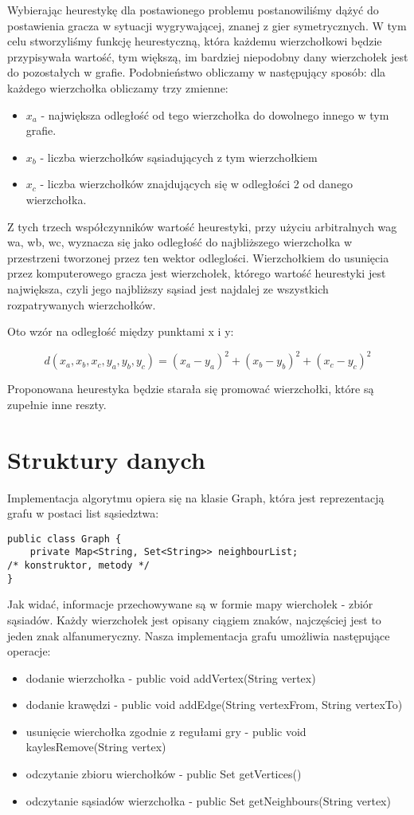 \documentclass[11pt,a4paper]{article}
\begin{document}
Wybierając heurestykę dla postawionego problemu postanowiliśmy dążyć do postawienia gracza w sytuacji wygrywającej, znanej z gier symetrycznych. W tym celu stworzyliśmy funkcję heurestyczną, która każdemu wierzchołkowi będzie przypisywała wartość, tym większą, im bardziej niepodobny dany wierzchołek jest do pozostałych w grafie. Podobnieństwo obliczamy w następujący sposób: dla każdego wierzchołka obliczamy trzy zmienne: 
\begin{itemize}
\item $x_a$ - największa odległość od tego wierzchołka do dowolnego innego w tym grafie.
\item $x_b$ - liczba wierzchołków sąsiadujących z tym wierzchołkiem
\item $x_c$ - liczba wierzchołków znajdujących się w odległości 2 od danego wierzchołka. 
\end{itemize}

Z tych trzech współczynników wartość heurestyki, przy użyciu arbitralnych wag wa, wb, wc, wyznacza się jako odległość do najbliższego wierzchołka w przestrzeni tworzonej przez ten wektor odleglości. Wierzchołkiem do usunięcia przez komputerowego gracza jest wierzchołek, którego wartość heurestyki jest największa, czyli jego najbliższy sąsiad jest najdalej ze wszystkich rozpatrywanych wierzchołków.

Oto wzór na odległość między punktami x i y:

$$d(x_a,x_b,x_c,y_a,y_b,y_c)=(x_a-y_a)^2+(x_b-y_b)^2+(x_c-y_c)^2 $$

Proponowana heurestyka będzie starała się promować wierzchołki, które są zupełnie inne reszty.

\section{Struktury danych}

Implementacja algorytmu opiera się na klasie Graph, która jest reprezentacją grafu w postaci list sąsiedztwa:
\begin{lstlisting}
public class Graph {
    private Map<String, Set<String>> neighbourList;
/* konstruktor, metody */
}
\end{lstlisting}

Jak widać, informacje przechowywane są w formie mapy wierchołek - zbiór sąsiadów. Każdy wierzchołek jest opisany ciągiem znaków, najczęściej jest to jeden znak alfanumeryczny. Nasza implementacja grafu umożliwia następujące operacje:
\begin{itemize}
\item dodanie wierzchołka  - public void addVertex(String vertex)
\item dodanie krawędzi - public void addEdge(String vertexFrom, String vertexTo)
\item usunięcie wierchołka zgodnie z regułami gry - public void kaylesRemove(String vertex)
\item odczytanie zbioru wierchołków - public Set getVertices()
\item odczytanie sąsiadów wierzchołka - public Set getNeighbours(String vertex)
\end{itemize}
\end{document}
